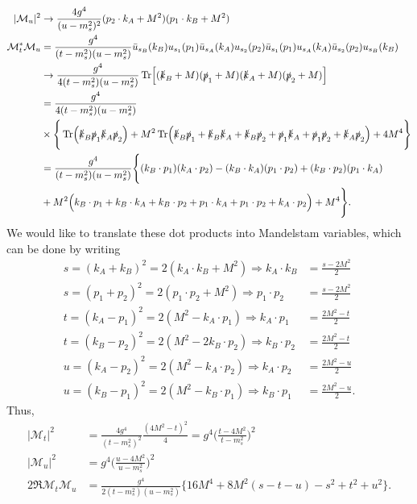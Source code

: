 {\begin{align}
%
    |\mathcal{M}_{u}|^2 &\rightarrow \frac{4 g^{4}}{(u - m_{s}^2)^2} ( p_2 \cdot k_{A} + M^2 ) ( p_1 \cdot k_{B} + M^2 ) \\
%
    \mathcal{M}_{t}^{*} \mathcal{M}_{u} &= \frac{g^{4}}{(t - m_{s}^2) (u - m_{s}^2)} \bar{u}_{s_{B}}(k_{B}) u_{s_1}(p_1) \bar{u}_{s_{A}}(k_{A}) u_{s_2}(p_2) \bar{u}_{s_1}(p_1) u_{s_{A}}(k_{A}) \bar{u}_{s_2}(p_2) u_{s_{B}}(k_{B}) \nonumber \\
    &\rightarrow \frac{g^{4}}{4 (t - m_{s}^2)(u - m_{s}^2)} \Tr[ ( \slashed{k}_{B} + M ) ( \slashed{p}_{1} + M ) ( \slashed{k}_{A} + M ) ( \slashed{p}_{2} + M ) ] \nonumber \\
    &= \frac{g^{4}}{4 (t - m_{s}^2) (u - m_{s}^2)} \nonumber \\
    &\times \Bigg\{ \Tr( \slashed{k}_{B} \slashed{p}_{1} \slashed{k}_{A} \slashed{p}_{2} ) + M^2 \Tr( \slashed{k}_{B} \slashed{p}_{1} + \slashed{k}_{B} \slashed{k}_{A} + \slashed{k}_{B} \slashed{p}_2 + \slashed{p}_{1} \slashed{k}_{A} + \slashed{p}_{1} \slashed{p}_{2} + \slashed{k}_{A} \slashed{p}_{2} ) + 4 M^{4} \Bigg\} \nonumber \\
    &= \frac{g^{4}}{(t - m_{s}^2) (u - m_{s}^2)} \Bigg\{ ( k_{B} \cdot p_{1} ) ( k_{A} \cdot p_2 ) - ( k_{B} \cdot k_{A} ) ( p_1 \cdot p_2 ) + ( k_{B} \cdot p_2 ) ( p_1 \cdot k_{A} ) \nonumber \\
    &+ M^2 \Big( k_{B} \cdot p_1 + k_{B} \cdot k_{A} + k_{B} \cdot p_2 + p_1 \cdot k_{A} + p_1 \cdot p_2 + k_{A} \cdot p_2 \Big) + M^{4} \Bigg\}
.\end{align}
We would like to translate these dot products into Mandelstam variables, which can be done by writing
\begin{align}
    s = (k_{A} + k_{B})^2 = 2 ( k_{A} \cdot k_{B} + M^2 ) \Rightarrow k_{A} \cdot k_{B} &= \frac{s - 2 M^2}{2} \\
    s = (p_1 + p_2)^2 = 2 ( p_1 \cdot p_2 + M^2 ) \Rightarrow p_1 \cdot p_2 &= \frac{s - 2 M^2}{2} \\
    t = (k_{A} - p_1)^2 = 2 (M^2 - k_{A} \cdot p_1) \Rightarrow k_{A} \cdot p_1 &= \frac{2 M^2 - t}{2} \\
    t = (k_{B} - p_2)^2 = 2 (M^2 - 2 k_{B} \cdot p_2) \Rightarrow k_{B} \cdot p_2 &= \frac{2 M^2 - t}{2} \\
    u = (k_{A} - p_2)^2 = 2 (M^2 - k_{A} \cdot p_2) \Rightarrow k_{A} \cdot p_2 &= \frac{2 M^2 - u}{2} \\
    u = (k_{B} - p_1)^2 = 2 ( M^2 - k_{B} \cdot p_1 ) \Rightarrow k_{B} \cdot p_1 &= \frac{2 M^2 - u}{2}
.\end{align}
Thus,
\begin{align}
    |\mathcal{M}_{t}|^2 &= \frac{4 g^{4}}{(t - m_{s}^2)^2} \frac{(4 M^2 - t)^2}{4} = g^{4} \Bigg( \frac{t - 4 M^2}{t - m_{s}^2} \Bigg)^2 \\
    |\mathcal{M}_{u}|^2 &= g^{4} \Bigg( \frac{u - 4 M^2}{u - m_{s}^2} \Bigg)^2 \\
    2 \Re{\mathcal{M}_{t} \mathcal{M}_{u}} &= \frac{g^{4}}{2 (t - m_{s}^2) (u - m_{s}^2)} \Bigg\{ 16 M^{4} + 8 M^2 (s - t - u) - s^2 + t^2 + u^2 \Bigg\}
.\end{align}

}
